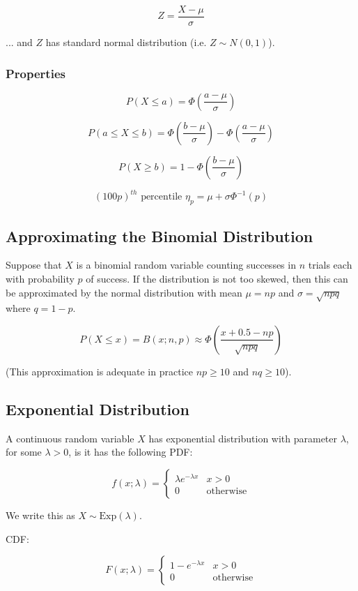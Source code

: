 $$ Z = \frac{X-\mu}{\sigma} $$

... and $Z$ has standard normal distribution (i.e. $Z \sim N(0,1)$).

\subsubsection{Properties}

$$ P(X \leq a) = \Phi\left(\frac{a-\mu}{\sigma}\right) $$

$$ P(a \leq X \leq b) = \Phi\left(\frac{b-\mu}{\sigma}\right) - \Phi\left(\frac{a-\mu}{\sigma}\right) $$

$$ P(X \geq b) = 1 - \Phi\left(\frac{b-\mu}{\sigma}\right) $$

$$ (100p)^{th} \text{ percentile } \eta_p = \mu + \sigma \Phi^{-1}(p) $$

\subsection{Approximating the Binomial Distribution}

Suppose that $X$ is a binomial random variable counting successes in $n$ trials each with probability $p$ of success. If the distribution is not too skewed, then this can be approximated by the normal distribution with mean $\mu = np$ and $\sigma = \sqrt{npq}$ where $q=1-p$.

$$ P(X \leq x) = B(x;n,p) \approx \Phi\left(\frac{x+0.5-np}{\sqrt{npq}}\right) $$

(This approximation is adequate in practice $np\geq 10$ and $nq \geq 10$).

\subsection{Exponential Distribution}

A continuous random variable $X$ has exponential distribution with parameter $\lambda$, for some $\lambda > 0$, is it has the following PDF:

$$ f(x; \lambda) = \begin{cases} \lambda e^{-\lambda x} & x > 0 \\ 0 & \text{otherwise} \end{cases} $$

We write this as $X \sim \text{Exp}(\lambda)$.

CDF:

$$ F(x; \lambda) = \begin{cases} 1 - e^{-\lambda x} & x > 0 \\ 0 & \text{otherwise} \end{cases} $$

